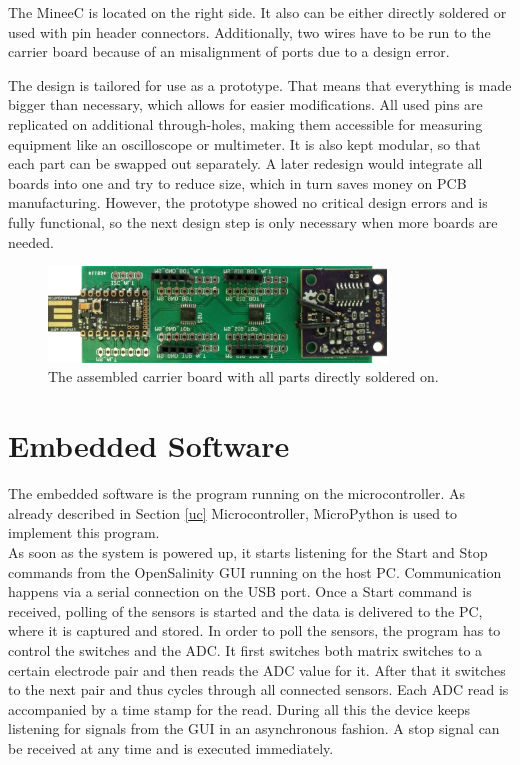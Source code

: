 The MineeC is located on the right side. It also can be either directly soldered or used with pin header connectors. Additionally, two wires have to be run to the carrier board because of an misalignment of ports due to a design error.

The design is tailored for use as a prototype. That means that everything is made bigger than necessary, which allows for easier modifications. All used pins are replicated on additional through-holes, making them accessible for measuring equipment like an oscilloscope or multimeter. It is also kept modular, so that each part can be swapped out separately. A later redesign would integrate all boards into one and try to reduce size, which in turn saves money on PCB manufacturing. However, the prototype showed no critical design errors and is fully functional, so the next design step is only necessary when more boards are needed.

\begin{figure}
	\begin{center}
		\includegraphics[width=0.8\textwidth]{images/cb.jpg} 
		\caption{The assembled carrier board with all parts directly soldered on.}
		\label{fig:cb}
	\end{center}
\end{figure}

\section{Embedded Software}

The embedded software is the program running on the microcontroller. As already described in Section \ref{uc} Microcontroller, MicroPython is used to implement this program.\\

As soon as the system is powered up, it starts listening for the Start and Stop commands from the OpenSalinity GUI running on the host PC. Communication happens via a serial connection on the USB port. Once a Start command is received, polling of the sensors is started and the data is delivered to the PC, where it is captured and stored.
In order to poll the sensors, the program has to control the switches and the ADC. It first switches both matrix switches to a certain electrode pair and then reads the ADC value for it. After that it switches to the next pair and thus cycles through all connected sensors. Each ADC read is accompanied by a time stamp for the read. During all this the device keeps listening for signals from the GUI in an asynchronous fashion. A stop signal can be received at any time and is executed immediately.\\

